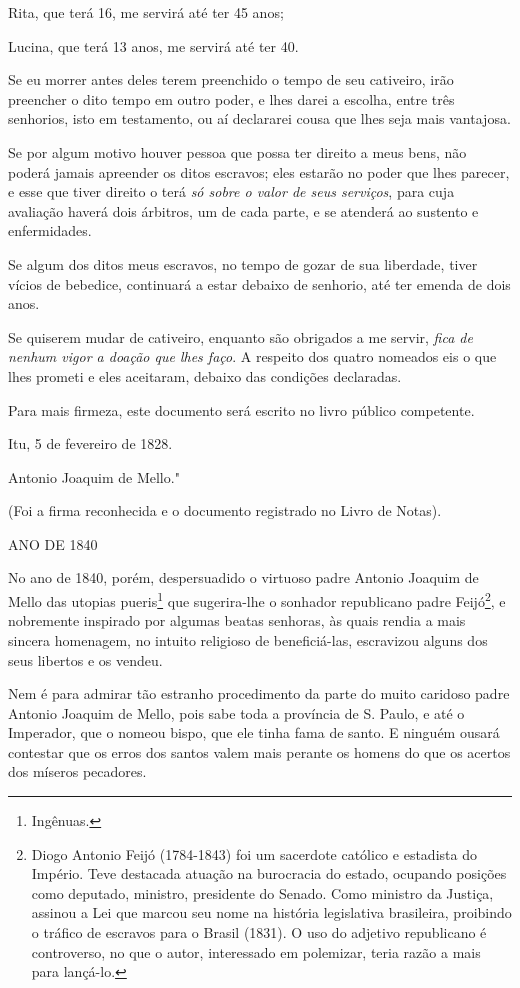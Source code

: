 Rita, que terá 16, me servirá até ter 45 anos;

Lucina, que terá 13 anos, me servirá até ter 40.

Se eu morrer antes deles terem preenchido o tempo de seu cativeiro, irão
preencher o dito tempo em outro poder, e lhes darei a escolha, entre
três senhorios, isto em testamento, ou aí declararei cousa que lhes seja
mais vantajosa.

Se por algum motivo houver pessoa que possa ter direito a meus bens, não
poderá jamais apreender os ditos escravos; eles estarão no poder que
lhes parecer, e esse que tiver direito o terá \emph{só sobre o valor de
seus serviços}, para cuja avaliação haverá dois árbitros, um de cada
parte, e se atenderá ao sustento e enfermidades.

Se algum dos ditos meus escravos, no tempo de gozar de sua liberdade,
tiver vícios de bebedice, continuará a estar debaixo de senhorio, até
ter emenda de dois anos.

Se quiserem mudar de cativeiro, enquanto são obrigados a me servir,
\emph{fica de nenhum vigor a doação que lhes faço}. A respeito dos
quatro nomeados eis o que lhes prometi e eles aceitaram, debaixo das
condições declaradas.

Para mais firmeza, este documento será escrito no livro público
competente.

Itu, 5 de fevereiro de 1828.

Antonio Joaquim de Mello."

(Foi a firma reconhecida e o documento registrado no Livro de Notas).

ANO DE 1840

No ano de 1840, porém, despersuadido o virtuoso padre Antonio Joaquim de
Mello das utopias pueris\footnote{Ingênuas.} que sugerira-lhe o
sonhador republicano padre Feijó\footnote{Diogo Antonio Feijó
  (1784-1843) foi um sacerdote católico e estadista do Império. Teve
  destacada atuação na burocracia do estado, ocupando posições como
  deputado, ministro, presidente do Senado. Como ministro da Justiça,
  assinou a Lei que marcou seu nome na história legislativa brasileira,
  proibindo o tráfico de escravos para o Brasil (1831). O uso do
  adjetivo republicano é controverso, no que o autor, interessado em
  polemizar, teria razão a mais para lançá-lo.}, e nobremente inspirado
por algumas beatas senhoras, às quais rendia a mais sincera homenagem,
no intuito religioso de beneficiá-las, escravizou alguns dos seus
libertos e os vendeu.

Nem é para admirar tão estranho procedimento da parte do muito caridoso
padre Antonio Joaquim de Mello, pois sabe toda a província de S. Paulo,
e até o Imperador, que o nomeou bispo, que ele tinha fama de santo. E
ninguém ousará contestar que os erros dos santos valem mais perante os
homens do que os acertos dos míseros pecadores.

